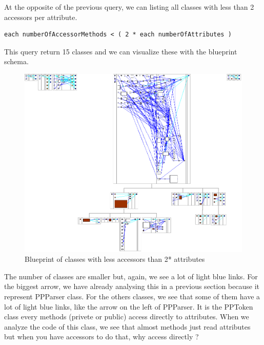 At the opposite of the previous query, we can listing all classes with less than 2 accessors per attribute.
\begin{lstlisting}
each numberOfAccessorMethods < ( 2 * each numberOfAttributes ) 
\end{lstlisting}
This query return 15 classes and we can visualize these with the blueprint schema.\\
\begin{figure}[ht]
\centering
\label{less_access_blueprint}
\includegraphics[scale=0.35]{less_access_blueprint.png}
\caption{Blueprint of classes with less accessors than 2* attributes}
\end{figure}
The number of classes are smaller but, again, we see a lot of light blue links.  For the biggest arrow, we have already analysing this in a previous section because it represent PPParser class.  For the others classes, we see that some of them have a lot of light blue links, like the arrow on the left of PPParser.  It is the PPToken class every methods (privete or public) access directly to attributes.  When we analyze the code of this class, we see that almost methods just read attributes but when you have accessors to do that, why access directly ?\\






